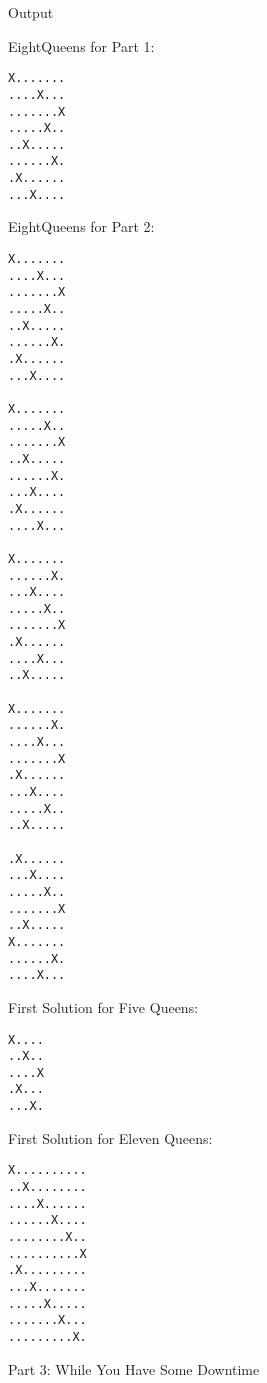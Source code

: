 \documentclass{article}
\begin{document}
\newpage
\begin{center}
Output
\end{center}
EightQueens for Part 1:
\begin{lstlisting}
X.......
....X...
.......X
.....X..
..X.....
......X.
.X......
...X....
\end{lstlisting}
EightQueens for Part 2:
\begin{lstlisting}
X.......
....X...
.......X
.....X..
..X.....
......X.
.X......
...X....

X.......
.....X..
.......X
..X.....
......X.
...X....
.X......
....X...

X.......
......X.
...X....
.....X..
.......X
.X......
....X...
..X.....

X.......
......X.
....X...
.......X
.X......
...X....
.....X..
..X.....

.X......
...X....
.....X..
.......X
..X.....
X.......
......X.
....X...
\end{lstlisting}
First Solution for Five Queens:
\begin{lstlisting}
X....
..X..
....X
.X...
...X.
\end{lstlisting}
First Solution  for Eleven Queens:
\begin{lstlisting}
X..........
..X........
....X......
......X....
........X..
..........X
.X.........
...X.......
.....X.....
.......X...
.........X.
\end{lstlisting}
\newpage
Part 3: While You Have Some Downtime \\
\end{document}
